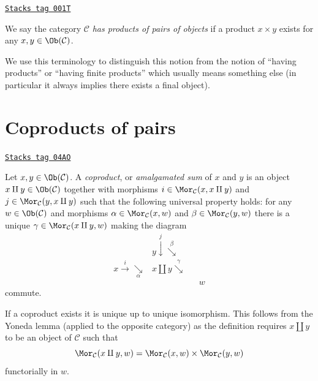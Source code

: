 \begin{definition}
\label{categories-definition-has-products-of-pairs}
\href{https://stacks.math.columbia.edu/tag/001T}{\texttt{Stacks tag 001T}}

We say the category $\mathcal{C}$ {\it has products of pairs
of objects} if a product $x \times y$
exists for any $x, y \in \Ob(\mathcal{C})$.
\end{definition}

We use this terminology to distinguish this notion from the notion
of ``having products'' or ``having finite products'' which usually means
something else (in particular it always implies there exists a
final object).

\section{Coproducts of pairs}
\label{categories-section-coproducts-pairs}
\begin{definition}[Coproducts]
\label{categories-definition-coproducts}
\href{https://stacks.math.columbia.edu/tag/04AO}{\texttt{Stacks tag 04AO}}

Let $x, y \in \Ob(\mathcal{C})$.
A {\it coproduct}, or {\it amalgamated sum} of $x$ and $y$ is
an object $x \amalg y \in \Ob(\mathcal{C})$
together with morphisms
$i \in \Mor_{\mathcal C}(x, x \amalg y)$ and
$j \in \Mor_{\mathcal C}(y, x \amalg y)$ such
that the following universal property holds: for
any $w \in \Ob(\mathcal{C})$ and morphisms
$\alpha \in \Mor_{\mathcal C}(x, w)$ and
$\beta \in \Mor_\mathcal{C}(y, w)$
there is a unique
$\gamma \in \Mor_{\mathcal C}(x \amalg y, w)$ making
the diagram
$$
\begin{array}{cccc} & y \overset{j}{\downarrow}\overset{\beta}{\searrow} &  &  \\ x \overset{i}{\longrightarrow}\underset{\alpha}{\searrow} & x \amalg y \overset{\gamma}{\searrow} &  &  \\  &  &  & w\end{array}
$$
commute.
\end{definition}

If a coproduct exists it is unique up to unique
isomorphism. This follows from the Yoneda lemma (applied to the
opposite category) as
the definition requires $x \amalg y$ to be an object
of $\mathcal{C}$ such that
$$
\Mor_\mathcal{C}(x \amalg y, w) =
\Mor_\mathcal{C}(x, w) \times \Mor_\mathcal{C}(y, w)
$$
functorially in $w$.

